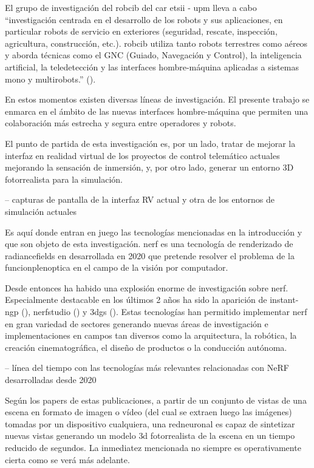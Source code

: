 \documentclass[a4paper, 12pt, spanish, twoside]{article}
\begin{document}
El grupo de investigación del \acrfull{robcib} del \acrshort{car} \acrshort{etsii} - \acrshort{upm} lleva a cabo “investigación centrada en el desarrollo de los robots y sus aplicaciones, en particular robots de servicio en exteriores (seguridad, rescate, inspección, agricultura, construcción, etc.). \acrshort{robcib} utiliza tanto robots terrestres como aéreos y aborda técnicas como el GNC (Guiado, Navegación y Control), la inteligencia artificial, la teledetección y las interfaces hombre-máquina aplicadas a sistemas mono y multirobots.” (\cite{robcib}).  

En estos momentos existen diversas líneas de investigación. El presente trabajo se enmarca en el ámbito de las nuevas interfaces hombre-máquina que permiten una colaboración más estrecha y segura entre operadores y robots. 

El punto de partida de esta investigación es, por un lado, tratar de mejorar la interfaz en realidad virtual de los proyectos de control telemático actuales mejorando la sensación de inmersión, y, por otro lado, generar un entorno 3D fotorrealista para la simulación. 

-- capturas de pantalla de la interfaz RV actual y otra de los entornos de simulación actuales 

Es aquí donde entran en juego las tecnologías mencionadas en la introducción y que son objeto de esta investigación. \acrfull{nerf} es una tecnología de \gls{renderizado} de \glspl{radiancefield} en desarrollada en 2020 que pretende resolver el problema de la \gls{funcionplenoptica} en el campo de la visión por computador. 

Desde entonces ha habido una explosión enorme de investigación sobre \acrshort{nerf}. Especialmente destacable en los últimos 2 años ha sido la aparición de \gls{instant-ngp} (\cite{mueller2022instant}), \gls{nerfstudio} (\cite{nerfstudio}) y \acrfull{3dgs} (\cite{kerbl3Dgaussians}). Estas tecnologías han permitido implementar \acrshort{nerf} en gran variedad de sectores generando nuevas áreas de investigación e implementaciones en campos tan diversos como la arquitectura, la robótica, la creación cinematográfica, el diseño de productos o la conducción autónoma. 

-- línea del tiempo con las tecnologías más relevantes relacionadas con NeRF desarrolladas desde 2020 

Según los papers de estas publicaciones, a partir de un conjunto de vistas de una escena en formato de imagen o vídeo (del cual se extraen luego las imágenes) tomadas por un dispositivo cualquiera, una \gls{redneuronal} es capaz de sintetizar nuevas vistas generando un modelo \acrshort{3d} fotorrealista de la escena en un tiempo reducido de segundos. La inmediatez mencionada no siempre es operativamente cierta como se verá más adelante. 
\end{document}
